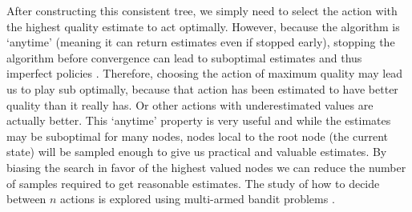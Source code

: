 \documentclass[msc, ai, logo, twoside, notimes, parskip, leftchapter, normalheadings]{infthesis}
\begin{document}
After constructing this consistent tree, we simply need to select the action with the highest quality estimate to act optimally. However, because the algorithm is `anytime' (meaning it can return estimates even if stopped early), stopping the algorithm before convergence can lead to suboptimal estimates and thus imperfect policies \citep{Gelly}. Therefore, choosing the action of maximum quality may lead us to play sub optimally, because that action has been estimated to have better quality than it really has. Or other actions with underestimated values are actually better. This `anytime' property is very useful and while the estimates may be suboptimal for many nodes, nodes local to the root node (the current state) will be sampled enough to give us practical and valuable estimates. By biasing the search in favor of the highest valued nodes we can reduce the number of samples required to get reasonable estimates. The study of how to decide between \(n\) actions is explored using multi-armed bandit problems \citep{Gelly}.
\\
\\
\end{document}
